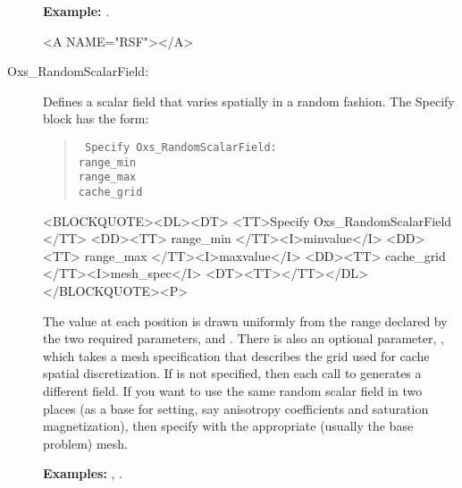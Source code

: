 \begin{description}
\textbf{Example:} .

\begin{rawhtml}<A NAME="RSF"></A>\end{rawhtml}%
%
\item[Oxs\_RandomScalarField:]\label{item:RandomScalarField}
Defines a scalar field that varies spatially in a random fashion.
The Specify block has the form:
      \begin{latexonly}
      \begin{quote}\tt
      Specify Oxs\_RandomScalarField: \ocb\\
       \bi range\_min \\
       \bi range\_max \\
       \bi cache\_grid \\
      \ccb
      \end{quote}
      \end{latexonly}
      \begin{rawhtml}<BLOCKQUOTE><DL><DT>
      <TT>Specify Oxs_RandomScalarField {</TT>
      <DD><TT> range_min </TT><I>minvalue</I>
      <DD><TT> range_max </TT><I>maxvalue</I>
      <DD><TT> cache_grid </TT><I>mesh_spec</I>
      <DT><TT>}</TT></DL></BLOCKQUOTE><P>
      \end{rawhtml}
The value at each position is drawn uniformly from the range declared by
the two required parameters,  and
.  There is also an optional parameter,
, which takes a mesh specification that describes
the grid used for cache spatial discretization.  If
 is not specified, then each call to
 generates a different field.  If you want to
use the same random scalar field in two places (as a base for setting,
say anisotropy coefficients and saturation magnetization), then specify
 with the appropriate (usually the base problem)
mesh.

\textbf{Examples:} , .


\end{description}
